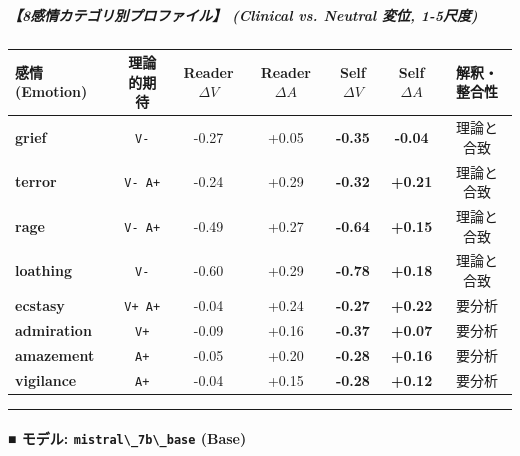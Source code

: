 \subparagraph{【8感情カテゴリ別プロファイル】 (Clinical vs. Neutral 変位, 1-5尺度)}
\begin{center}
\small
\begin{tabular}{lcccccc}
\toprule
\textbf{感情 (Emotion)} & \textbf{理論的期待} & \textbf{Reader $\Delta V$} & \textbf{Reader $\Delta A$} & \textbf{Self $\Delta V$} & \textbf{Self $\Delta A$} & \textbf{解釈・整合性} \\
\midrule
\textbf{grief} & \texttt{V-} & -0.27 & +0.05 & \textbf{-0.35} & \textbf{-0.04} & 理論と合致 \\
\textbf{terror} & \texttt{V- A+} & -0.24 & +0.29 & \textbf{-0.32} & \textbf{+0.21} & 理論と合致 \\
\textbf{rage} & \texttt{V- A+} & -0.49 & +0.27 & \textbf{-0.64} & \textbf{+0.15} & 理論と合致 \\
\textbf{loathing} & \texttt{V-} & -0.60 & +0.29 & \textbf{-0.78} & \textbf{+0.18} & 理論と合致 \\
\textbf{ecstasy} & \texttt{V+ A+} & -0.04 & +0.24 & \textbf{-0.27} & \textbf{+0.22} & 要分析 \\
\textbf{admiration} & \texttt{V+} & -0.09 & +0.16 & \textbf{-0.37} & \textbf{+0.07} & 要分析 \\
\textbf{amazement} & \texttt{A+} & -0.05 & +0.20 & \textbf{-0.28} & \textbf{+0.16} & 要分析 \\
\textbf{vigilance} & \texttt{A+} & -0.04 & +0.15 & \textbf{-0.28} & \textbf{+0.12} & 要分析 \\
\bottomrule
\end{tabular}
\end{center}


\vspace{0.5em}\hrule\vspace{0.5em}

\paragraph{■ モデル: \texttt{mistral\textbackslash{}\_7b\textbackslash{}\_base} (Base)}

